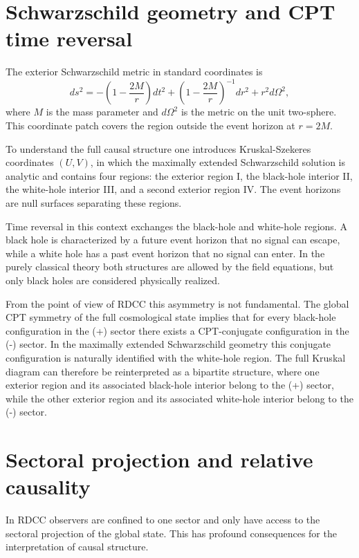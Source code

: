 \documentclass[11pt,a4paper]{article}
\begin{document}
\section{Schwarzschild geometry and CPT time reversal}

The exterior Schwarzschild metric in standard coordinates is
\begin{equation}
ds^{2} = -\left(1 - \frac{2M}{r}\right) dt^{2} + \left(1 - \frac{2M}{r}\right)^{-1} dr^{2} + r^{2} d\Omega^{2},
\end{equation}
where \(M\) is the mass parameter and \(d\Omega^{2}\) is the metric on the unit two-sphere. This coordinate patch covers the region outside the event horizon at \(r = 2M\).

To understand the full causal structure one introduces Kruskal-Szekeres coordinates \((U,V)\), in which the maximally extended Schwarzschild solution is analytic and contains four regions: the exterior region I, the black-hole interior II, the white-hole interior III, and a second exterior region IV. The event horizons are null surfaces separating these regions.

Time reversal in this context exchanges the black-hole and white-hole regions. A black hole is characterized by a future event horizon that no signal can escape, while a white hole has a past event horizon that no signal can enter. In the purely classical theory both structures are allowed by the field equations, but only black holes are considered physically realized.

From the point of view of RDCC this asymmetry is not fundamental. The global CPT symmetry of the full cosmological state implies that for every black-hole configuration in the (+) sector there exists a CPT-conjugate configuration in the (-) sector. In the maximally extended Schwarzschild geometry this conjugate configuration is naturally identified with the white-hole region. The full Kruskal diagram can therefore be reinterpreted as a bipartite structure, where one exterior region and its associated black-hole interior belong to the (+) sector, while the other exterior region and its associated white-hole interior belong to the (-) sector.

\section{Sectoral projection and relative causality}

In RDCC observers are confined to one sector and only have access to the sectoral projection of the global state. This has profound consequences for the interpretation of causal structure.
\end{document}
